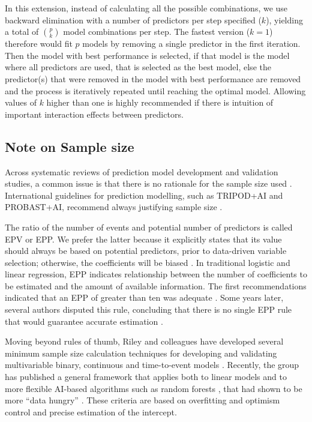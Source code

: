 In this extension, instead of calculating all the possible combinations, we use backward elimination with a number of predictors per step specified ($k$), yielding a total of $\binom{p}{k}$ model combinations per step. The fastest version ($k = 1$) therefore would fit $p$ models by removing a single predictor in the first iteration. Then the model with best performance is selected, if that model is the model where all predictors are used, that is selected as the best model, else the predictor(s) that were removed in the model with best performance are removed and the process is iteratively repeated until reaching the optimal model. Allowing values of $k$ higher than one is highly recommended if there is intuition of important interaction effects between predictors.

\subsection{Note on Sample size}
\label{sec:sample_size}
Across systematic reviews of prediction model development and validation studies, a common issue is that there is no rationale for the sample size used \cite{barrenadaADNEXRiskPrediction2024,wynantsPredictionModelsDiagnosis2020}. International guidelines for prediction modelling, such as TRIPOD+AI and PROBAST+AI, recommend always justifying sample size \cite{collinsTRIPODAIStatementUpdated2024,moonsPROBASTAIUpdatedQuality2025}.

The ratio of the number of events and potential number of predictors is called \gls{EPV} or \gls{EPP}. We prefer the latter because it explicitly states that its value should always be based on potential predictors, prior to data-driven variable selection; otherwise, the coefficients will be biased  \cite{steyerbergLogisticRegressionModeling2011}. In traditional logistic and linear regression, \gls{EPP} indicates relationship between the number of coefficients to be estimated and the amount of available information. The first recommendations indicated that an \gls{EPP} of greater than ten was adequate \cite{concatoImportanceEventsIndependent1995,peduzziSimulationStudyNumber1996}. Some years later, several authors disputed this rule, concluding that there is no single \gls{EPP} rule that would guarantee accurate estimation \cite{vittinghoffRelaxingRuleTen2007,courvoisierPerformanceLogisticRegression2011,vansmedenNoRationale12016}.

Moving beyond rules of thumb, Riley and colleagues have developed several minimum sample size calculation techniques for developing and validating multivariable binary, continuous and time-to-event models \cite{archerMinimumSampleSize2021,pateMinimumSampleSize2023,rileyMinimumSampleSize2022,rileyEvaluationClinicalPrediction2024a,rileyMinimumSampleSize2019,rileyMinimumSampleSize2019a}. Recently, the group has published a general framework that applies both to linear models and to more flexible AI-based algorithms such as random forests \cite{rileyGeneralSampleSize2026}, that had shown to be more ``data hungry'' \cite{austinRelativeDataHungriness2024,vanderploegModernModellingTechniques2014}. These criteria are based on overfitting and optimism control and precise estimation of the intercept.

